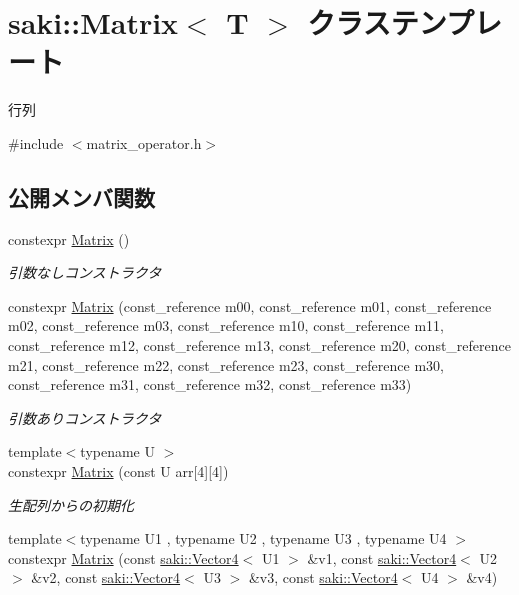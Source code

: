 \hypertarget{classsaki_1_1_matrix}{}\section{saki\+:\+:Matrix$<$ T $>$ クラステンプレート}
\label{classsaki_1_1_matrix}


行列  




{\ttfamily \#include $<$matrix\+\_\+operator.\+h$>$}

\subsection*{公開メンバ関数}
\begin{DoxyCompactItemize}
\item 
constexpr \mbox{\hyperlink{classsaki_1_1_matrix_a820035e9bafc0fa4269c4b94b1ec4f4f}{Matrix}} ()
\begin{DoxyCompactList}\small\item\em 引数なしコンストラクタ \end{DoxyCompactList}\item 
constexpr \mbox{\hyperlink{classsaki_1_1_matrix_adaebd9a3c078f5c10eaf225d70faaa66}{Matrix}} (const\+\_\+reference m00, const\+\_\+reference m01, const\+\_\+reference m02, const\+\_\+reference m03, const\+\_\+reference m10, const\+\_\+reference m11, const\+\_\+reference m12, const\+\_\+reference m13, const\+\_\+reference m20, const\+\_\+reference m21, const\+\_\+reference m22, const\+\_\+reference m23, const\+\_\+reference m30, const\+\_\+reference m31, const\+\_\+reference m32, const\+\_\+reference m33)
\begin{DoxyCompactList}\small\item\em 引数ありコンストラクタ \end{DoxyCompactList}\item 
{\footnotesize template$<$typename U $>$ }\\constexpr \mbox{\hyperlink{classsaki_1_1_matrix_a3d877c3e3581397370561be931972cb9}{Matrix}} (const U arr\mbox{[}4\mbox{]}\mbox{[}4\mbox{]})
\begin{DoxyCompactList}\small\item\em 生配列からの初期化 \end{DoxyCompactList}\item 
{\footnotesize template$<$typename U1 , typename U2 , typename U3 , typename U4 $>$ }\\constexpr \mbox{\hyperlink{classsaki_1_1_matrix_a80d205d0ee14a41465f56f6ecc8a8c4c}{Matrix}} (const \mbox{\hyperlink{classsaki_1_1_vector4}{saki\+::\+Vector4}}$<$ U1 $>$ \&v1, const \mbox{\hyperlink{classsaki_1_1_vector4}{saki\+::\+Vector4}}$<$ U2 $>$ \&v2, const \mbox{\hyperlink{classsaki_1_1_vector4}{saki\+::\+Vector4}}$<$ U3 $>$ \&v3, const \mbox{\hyperlink{classsaki_1_1_vector4}{saki\+::\+Vector4}}$<$ U4 $>$ \&v4)

\end{DoxyCompactItemize}
